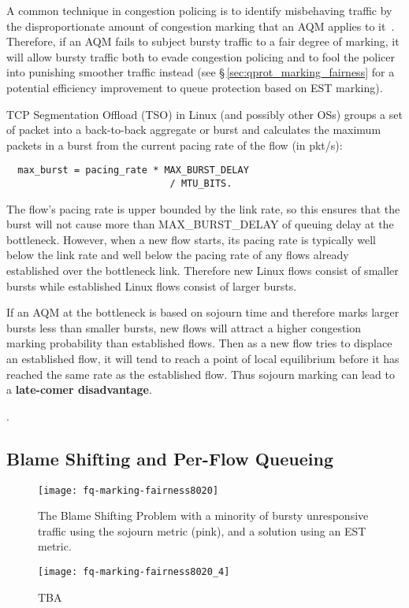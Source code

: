 A common technique in congestion policing is to identify misbehaving traffic by the disproportionate amount of congestion marking that an AQM applies to it~\cite{Floyd99:Penalty_box}. Therefore, if an AQM fails to subject bursty traffic to a fair degree of marking, it will allow bursty traffic both to evade congestion policing and to fool the policer into punishing smoother traffic instead (see \S\,\ref{sec:qprot_marking_fairness} for a potential efficiency improvement to queue protection based on EST marking).

TCP Segmentation Offload (TSO) in Linux (and possibly other OSs) groups a set of packet into a back-to-back aggregate or burst and calculates the maximum packets in a burst from the current pacing rate of the flow (in pkt/s):
\begin{verbatim}
  max_burst = pacing_rate * MAX_BURST_DELAY
                             / MTU_BITS.
\end{verbatim}
The flow's pacing rate is upper bounded by the link rate, so this ensures that the burst will not cause more than MAX\_BURST\_DELAY of queuing delay at the bottleneck. However, when a new flow starts, its pacing rate is typically well below the link rate and well below the pacing rate of any flows already established over the bottleneck link. Therefore new Linux flows consist of smaller bursts while established Linux flows consist of larger bursts. 

If an AQM at the bottleneck is based on sojourn time and therefore marks larger bursts less than smaller bursts, new flows will attract a higher congestion marking probability than established flows. Then as a new flow tries to displace an established flow, it will tend to reach a point of local equilibrium before it has reached the same rate as the established flow. Thus sojourn marking can lead to a \textbf{late-comer disadvantage}.

.

\subsection{Blame Shifting and Per-Flow Queueing}\label{sec:fq_blame_shifting}


\begin{figure}[h]
	\centering
	\texttt{[image: fq-marking-fairness8020]}
	\caption{The Blame Shifting Problem with a minority of bursty unresponsive traffic using the sojourn metric (pink), and a solution using an EST metric.}\label{fig:fq-marking-fairness8020}
\end{figure}

\begin{figure}[h]
	\centering
	\texttt{[image: fq-marking-fairness8020\_4]}
	\caption{TBA}\label{fig:fq-marking-fairness8020_4}
\end{figure}


